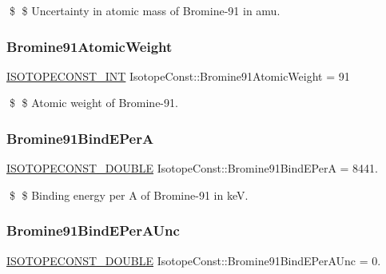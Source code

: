 \$ \$ Uncertainty in atomic mass of Bromine-\/91 in amu. \mbox{\label{group___isotope_const-_bromine-_br91_ga8f44e194ada41a1c0dd26bc247c471b8}} 
\subsubsection{\texorpdfstring{Bromine91\+Atomic\+Weight}{Bromine91AtomicWeight}}
{\footnotesize\ttfamily \mbox{\hyperlink{group___isotope_const-_macros_ga5f18360b3e99483a35c32d789e62621c}{I\+S\+O\+T\+O\+P\+E\+C\+O\+N\+S\+T\+\_\+\+I\+NT}} Isotope\+Const\+::\+Bromine91\+Atomic\+Weight = 91}

\$ \$ Atomic weight of Bromine-\/91. \mbox{\label{group___isotope_const-_bromine-_br91_ga4e66d0cdd450c5d32017cf8458b886d4}} 
\subsubsection{\texorpdfstring{Bromine91\+Bind\+E\+PerA}{Bromine91BindEPerA}}
{\footnotesize\ttfamily \mbox{\hyperlink{group___isotope_const-_macros_ga8f45a7272ce02c0b4c65c44636ed719a}{I\+S\+O\+T\+O\+P\+E\+C\+O\+N\+S\+T\+\_\+\+D\+O\+U\+B\+LE}} Isotope\+Const\+::\+Bromine91\+Bind\+E\+PerA = 8441.}

\$ \$ Binding energy per A of Bromine-\/91 in keV. \mbox{\label{group___isotope_const-_bromine-_br91_ga24e4e7677249d0be679186a54b0c6787}} 
\subsubsection{\texorpdfstring{Bromine91\+Bind\+E\+Per\+A\+Unc}{Bromine91BindEPerAUnc}}
{\footnotesize\ttfamily \mbox{\hyperlink{group___isotope_const-_macros_ga8f45a7272ce02c0b4c65c44636ed719a}{I\+S\+O\+T\+O\+P\+E\+C\+O\+N\+S\+T\+\_\+\+D\+O\+U\+B\+LE}} Isotope\+Const\+::\+Bromine91\+Bind\+E\+Per\+A\+Unc = 0.}

